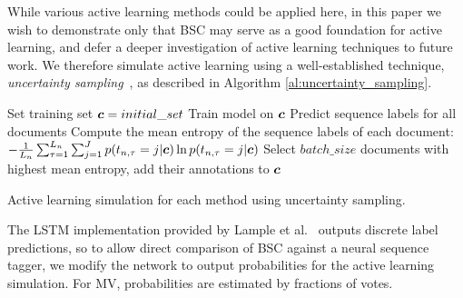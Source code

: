 While various active learning methods could be applied here, in this paper we wish
to demonstrate only that BSC may serve as a good foundation for active learning,
and defer a deeper investigation of active learning techniques to future work.
We therefore simulate active learning using a well-established technique, \emph{uncertainty sampling}~\cite{settles2008analysis,settles2010active},
as described in Algorithm \ref{al:uncertainty_sampling}.
\begin{algorithm}
\DontPrintSemicolon
 \nl Set training set $\boldsymbol c=initial\_set$ \;
 {
 \nl Train model on $\boldsymbol c$ \;
 \nl Predict sequence labels for all documents\;
 \nl Compute the mean entropy of the sequence labels of each document: 
 $-\frac{1}{L_n} \sum_{\tau=1}^{L_n}
 \sum_{j=1}^J
 p(t_{n,\tau} = j | \boldsymbol c) \ln p(t_{n,\tau} = j | \boldsymbol c) $
 \;
 \nl Select $batch\_size$ documents with highest mean entropy, add their annotations to $\boldsymbol c$\;
 }
\caption{Active learning simulation for each method using uncertainty sampling.}
\label{al:uncertainty_sampling}
\end{algorithm}
The LSTM implementation provided by Lample et al.~ 
outputs discrete label predictions, so to allow direct comparison of BSC against a neural sequence tagger,
we modify the network to output probabilities for the active learning simulation. For MV, probabilities
are estimated by fractions of votes.

